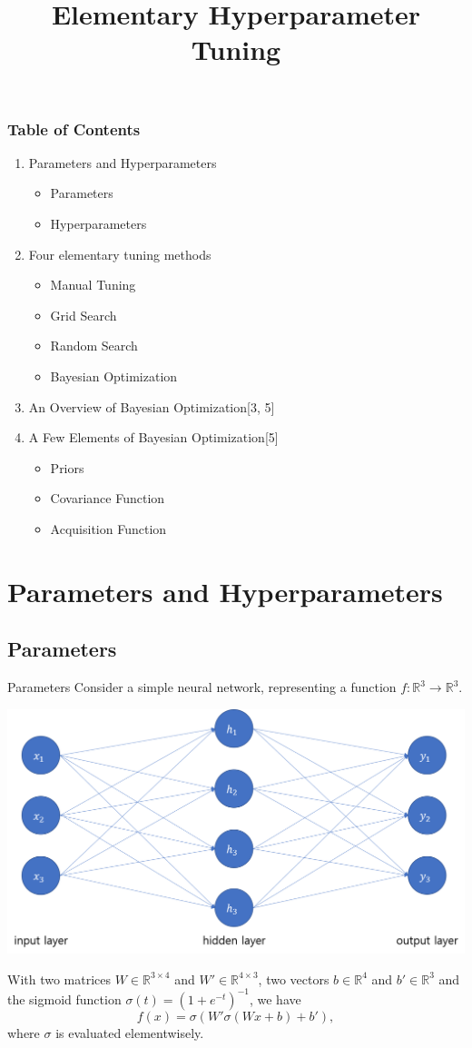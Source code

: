 \documentclass{beamer}
\title{Elementary Hyperparameter Tuning}
\begin{document}
%
\frame{\titlepage}

%
\begin{frame}
\frametitle{Table of Contents}
\begin{enumerate}[1.]
\item
Parameters and Hyperparameters
\begin{itemize}
\item
Parameters
\item
Hyperparameters
\end{itemize}
\item
Four elementary tuning methods
\begin{itemize}
\item
Manual Tuning
\item
Grid Search
\item
Random Search
\item
Bayesian Optimization
\end{itemize}
\item
An Overview of Bayesian Optimization[3, 5]
\item
A Few Elements of Bayesian Optimization[5]
\begin{itemize}
\item
Priors
\item
Covariance Function
\item
Acquisition Function
\end{itemize}
\end{enumerate}
\end{frame}

\section{Parameters and Hyperparameters}

\subsection{Parameters}

%
\begin{frame}{Parameters}
Consider a simple neural network, representing  a function \(f:\mathbb R^3\to\mathbb R^3\).
\begin{center}
\includegraphics[width=.5\textwidth]{1_1_mlp}
\end{center}
With two matrices \(W\in\mathbb R^{3\times 4}\) and \(W'\in\mathbb R^{4\times 3}\), two vectors \(b\in\mathbb R^4\) and \(b'\in\mathbb R^3\) and the sigmoid function \(\sigma(t)=(1+e^{-t})^{-1}\), we have
\begin{equation}\label{f}
f(x)=\sigma(W'\sigma(Wx+b)+b'),
\end{equation}
where \(\sigma\) is evaluated elementwisely.
\end{frame}
\end{document}
